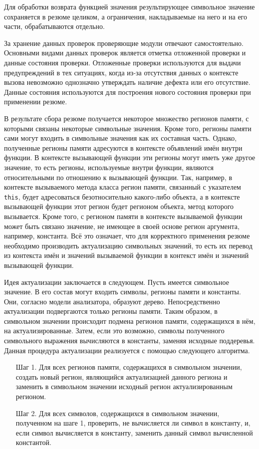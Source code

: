 Для обработки возврата функцией значения результирующее символьное значение сохраняется в резюме целиком, а ограничения, накладываемые на него и на его части, обрабатываются отдельно.

За хранение данных проверок проверяющие модули отвечают самостоятельно. Основными видами данных проверок является отметка отложенной проверки и данные состояния проверки. Отложенные проверки используются для выдачи предупреждений в тех ситуациях, когда из-за отсутствия данных о контексте вызова невозможно однозначно утверждать наличие дефекта или его отсутствие. Данные состояния используются для построения нового состояния проверки при применении резюме. 

В результате сбора резюме получается некоторое множество регионов памяти, с которыми связаны некоторые символьные значения. Кроме того, регионы памяти сами могут входить в символьные значения как их составная часть. Однако, полученные регионы памяти адресуются в контексте объявлений имён внутри функции. В контексте вызывающей функции эти регионы могут иметь уже другое значение, то есть регионы, используемые внутри функции, являются относительными по отношению к вызывающей функции. Так, например, в контексте вызываемого метода класса регион памяти, связанный с указателем \texttt{this}, будет адресоваться безотносительно какого-либо объекта, а в контексте вызывающей функции этот регион будет регионом объекта, метод которого вызывается. Кроме того, с регионом памяти в контексте вызываемой функции может быть связано значение, не имеющее в своей основе регион аргумента, например, константа. Всё это означает, что для корректного применения резюме необходимо производить актуализацию символьных значений, то есть их перевод из контекста имён и значений вызываемой функции в контекст имён и значений вызывающей функции.

Идея актуализации заключается в следующем. Пусть имеется символьное значение. В его состав могут входить символы, регионы памяти и константы. Они, согласно модели анализатора, образуют дерево. Непосредственно актуализации подвергаются только регионы памяти. Таким образом, в символьном значении происходит подмена регионов памяти, содержащихся в нём, на актуализированные. Затем, если это возможно, символы полученного символьного выражения вычисляются в константы, заменяя исходные поддеревья. Данная процедура актуализации реализуется с помощью следующего алгоритма.

\begin{enumerate}
 \item[Шаг 1.] Для всех регионов памяти, содержащихся в символьном значении, создать новый регион, являющийся актуализацией данного региона и заменить в символьном значении исходный регион актуализированным регионом.
 \item[Шаг 2.] Для всех символов, содержащихся в символьном значении, полученном на шаге 1, проверить, не вычисляется ли символ в константу, и, если символ вычисляется в константу, заменить данный символ вычисленной константой.
\end{enumerate}

